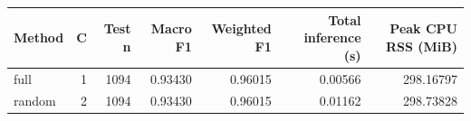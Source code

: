 \begin{tabular}{lrrrrrr}
\toprule
Method & C & Test n & Macro F1 & Weighted F1 & Total inference (s) & Peak CPU RSS (MiB) \\
\midrule
full & 1 & 1094 & 0.93430 & 0.96015 & 0.00566 & 298.16797 \\
random & 2 & 1094 & 0.93430 & 0.96015 & 0.01162 & 298.73828 \\
\bottomrule
\end{tabular}
